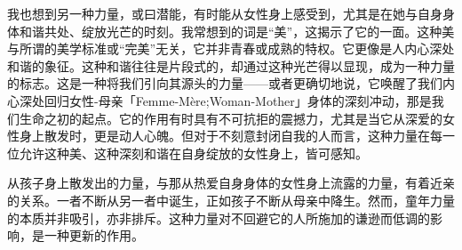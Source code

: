 我也想到另一种力量，或曰潜能，有时能从女性身上感受到，尤其是在她与自身身体和谐共处、绽放光芒的时刻。我常想到的词是“美”，这揭示了它的一面。这种美与所谓的美学标准或“完美”无关，它并非青春或成熟的特权。它更像是人内心深处和谐的象征。这种和谐往往是片段式的，却通过这种光芒得以显现，成为一种力量的标志。这是一种将我们引向其源头的力量——或者更确切地说，它唤醒了我们内心深处回归女性-母亲「Femme-Mère;Woman-Mother」身体的深刻冲动，那是我们生命之初的起点。它的作用有时具有不可抗拒的震撼力，尤其是当它从深爱的女性身上散发时，更是动人心魄。但对于不刻意封闭自我的人而言，这种力量在每一位允许这种美、这种深刻和谐在自身绽放的女性身上，皆可感知。

从孩子身上散发出的力量，与那从热爱自身身体的女性身上流露的力量，有着近亲的关系。一者不断从另一者中诞生，正如孩子不断从母亲中降生。然而，童年力量的本质并非吸引，亦非排斥。这种力量对不回避它的人所施加的谦逊而低调的影响，是一种更新的作用。